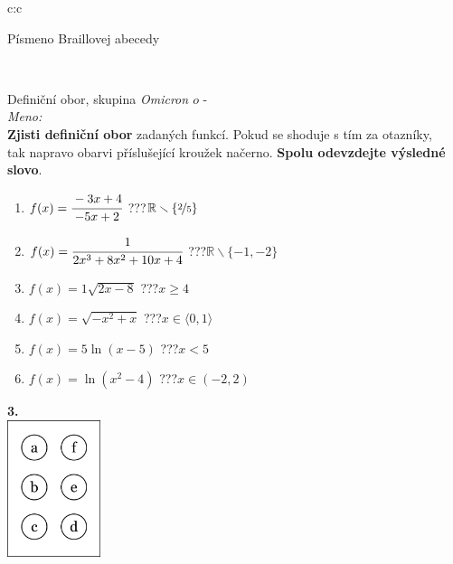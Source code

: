 \documentclass[10pt]{report}
\newcommand\omicron{o}
\begin{document}
\begin{tabular}{c:c}
\begin{minipage}[c][99mm][t]{0.49\linewidth}
\begin{center}
\begin{minipage}{0.20\linewidth}
\begin{center}
{\small Písmeno Braillovej abecedy}
\end{center}
\end{minipage}
\end{center}
\end{minipage}
\\ \hdashline
\begin{minipage}[c][99mm][t]{0.49\linewidth}
\begin{center}
\vspace{7mm}
{\huge Definiční obor, skupina \textit{Omicron $\omicron$} -}\\[4.5mm]
\textit{Meno:}\phantom{xxxxxxxxxxxxxxxxxxxxxxxxxxxxxxxxxxxxxxxxxxxxxxxxxxxxxxxxxxxxxxxxx}\\[3.5mm]
\textbf{Zjisti definiční obor} zadaných funkcí. Pokud se shoduje s tím za otazníky,\\tak napravo obarvi příslušející kroužek načerno. \textbf{Spolu odevzdejte výsledné slovo}.\\[3mm]
\begin{minipage}{0.77\linewidth}
\begin{center}
\begin{varwidth}{\textwidth}
\begin{enumerate}
\normalsize
\item $f(x)=\cfrac{-3x+4}{-5x+2}$\quad \dotfill\; ???\;\dotfill \quad $\mathbb{R}\smallsetminus\{\nicefrac{2}{5}\}$
\item $f(x)=\cfrac{1}{2x^3+8x^2+10x+4}$\quad \dotfill\; ???\;\dotfill \quad $\mathbb{R}\smallsetminus\{-1,-2\}$
\item $f(x)=1\sqrt{2x-8}$\quad \dotfill\; ???\;\dotfill \quad $x\geq4$
\item $f(x)=\sqrt{-x^2+x}$\quad \dotfill\; ???\;\dotfill \quad $x\in\langle0 , 1\rangle$
\item $f(x)=5\ln{(x-5)}$\quad \dotfill\; ???\;\dotfill \quad $x<5$
\item $f(x)=\ln{(x^2-4)}$\quad \dotfill\; ???\;\dotfill \quad $x\in(-2 , 2)$
\end{enumerate}
\end{varwidth}
\end{center}
\end{minipage}
\begin{minipage}{0.20\linewidth}
\begin{center}
{\Huge\bfseries 3.} \\[2mm]
\includegraphics[height=40mm]{../images/braille.png}

\end{center}
\end{minipage}
\end{center}
\end{minipage}
\end{tabular}
\end{document}
